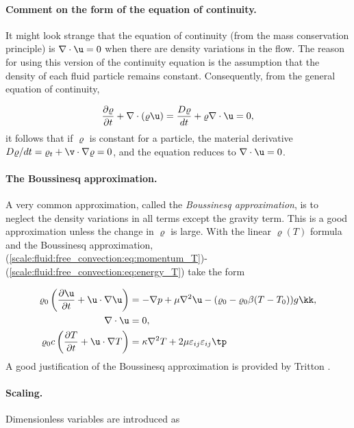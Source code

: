 \documentclass[graybox,envcountchap,sectrefs,final]{svmonodo}
\begin{document}
\paragraph{Comment on the form of the equation of continuity.}
It might look strange that the equation of continuity (from the mass
conservation principle) is $\nabla\cdot\u =0$
when there are density variations in the flow. The reason for using
this version of the continuity equation is the assumption that
the density of each fluid particle remains constant. Consequently,
from the general equation of continuity,

\[ \frac{\partial\varrho}{\partial t} + \nabla\cdot (\varrho \u) =
\frac{D\varrho}{dt} + \varrho \nabla\cdot\u = 0,\]
it follows that if $\varrho$ is constant for a particle,
the material derivative $D\varrho/dt = \varrho_{t} + \v\cdot\nabla\varrho = 0$,
and the equation reduces to $\nabla\cdot\u = 0$.

\paragraph{The Boussinesq approximation.}
A very common approximation, called the \emph{Boussinesq approximation}, is
to neglect the density variations in all terms except the gravity term.
This is a good approximation unless the change in $\varrho$ is large.
With the linear $\varrho(T)$ formula and the Boussinesq approximation,
(\ref{scale:fluid:free_convection:eq:momentum_T})-(\ref{scale:fluid:free_convection:eq:energy_T})
take the form

\begin{align}
\varrho_0\left(\frac{\partial \u}{\partial t} + \u\cdot\nabla\u\right)
&= -\nabla p + \mu\nabla^2\u - (\varrho_0 - \varrho_0\beta(T-T_0))g\kk,
\label{scale:fluid:free_convection:eq:momentum_TB}\\ 
\nabla\cdot\u & = 0,
\label{scale:fluid:free_convection:eq:cont_TB}\\ 
\varrho_0 c\left(\frac{\partial T}{\partial t} + \u\cdot\nabla T\right)
&= \kappa\nabla^2 T + 2\mu\varepsilon_{ij}\varepsilon_{ij}\tp
\label{scale:fluid:free_convection:eq:energy_TB}\\ 
\end{align}
A good justification of the Boussinesq approximation is provided
by Tritton \cite[Ch.~13]{Tritton}.

\paragraph{Scaling.}
Dimensionless variables are introduced as
\end{document}
